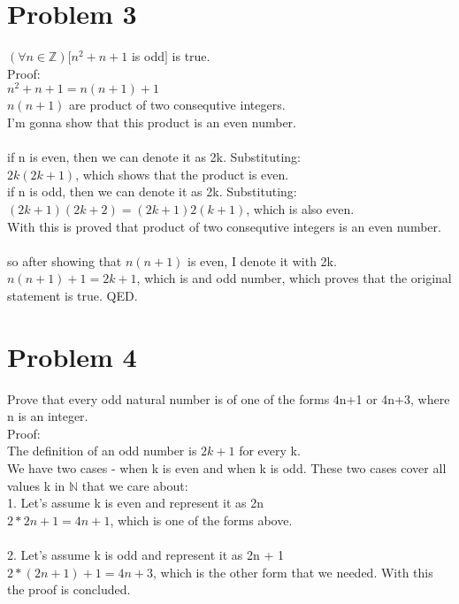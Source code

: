 \documentclass{article}
\begin{document}
\section*{Problem 3}
$(\forall n \in \mathbb{Z})[n^2 + n + 1$ is odd$]$ is true.\\
Proof:\\
$n^2 + n + 1 = n(n+1) + 1$\\
$n(n+1)$ are product of two consequtive integers.\\
I'm gonna show that this product is an even number.\\
\\
if n is even, then we can denote it as 2k. Substituting:\\
$2k(2k + 1)$, which shows that the product is even.\\
if n is odd, then we can denote it as 2k. Substituting:\\
$(2k+1)(2k+2) = (2k+1)2(k+1)$, which is also even.\\
With this is proved that product of two consequtive integers is an even number.\\
\\
so after showing that $n(n+1)$ is even, I denote it with 2k.\\
$n(n+1) + 1 = 2k + 1$, which is and odd number, which proves that the original statement is true. QED.

\section*{Problem 4}
Prove that every odd natural number is of one of the forms 4n+1 or 4n+3, where n is an integer.\\
Proof:\\
The definition of an odd number is $2k + 1$ for every k.\\
We have two cases - when k is even and when k is odd. These two cases cover all values k in $\mathbb{N}$ that we care about:\\
1. Let's assume k is even and represent it as 2n\\
$2*2n + 1 = 4n + 1$, which is one of the forms above.\\
\\
2. Let's assume k is odd and represent it as 2n + 1\\
$2*(2n + 1) + 1 = 4n + 3$, which is the other form that we needed. With this the proof is concluded.\\
\end{document}
